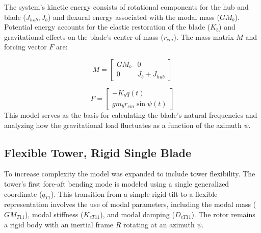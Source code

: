 \documentclass[onecolumn,draftcls]{IEEEtran}
\begin{document}
The system's kinetic energy consists of rotational components for the hub and blade ($J_{hub}, J_b$) and flexural energy associated with the modal mass ($GM_b$). Potential energy accounts for the elastic restoration of the blade ($K_b$) and gravitational effects on the blade's center of mass ($r_{cm}$). The mass matrix $M$ and forcing vector $F$ are:

\begin{equation}
    \label{eq:flex_blade_mass_matrix} M =
    \begin{bmatrix}
        GM_{b} & 0 \\
        0 & J_{b} + J_{hub}
    \end{bmatrix}
\end{equation}

\begin{equation} 
    \label{eq:flex_blade_forcing_terms} F =
    \begin{bmatrix}
        -K_{b} q(t) \\
        g m_{b} r_{cm} \sin\psi(t)
    \end{bmatrix} 
\end{equation}
This model serves as the basis for calculating the blade's natural frequencies and analyzing how the gravitational load fluctuates as a function of the azimuth $\psi$.

\subsection*{Flexible Tower, Rigid Single Blade}
To increase complexity the model was expanded to include tower flexibility. The tower's first fore-aft bending mode is modeled using a single generalized coordinate ($q_{T1}$). This transition from a simple rigid tilt to a flexible representation involves the use of modal parameters, including the modal mass ($GM_{T11}$), modal stiffness ($K_{eT11}$), and modal damping ($D_{eT11}$). The rotor remains a rigid body with an inertial frame $R$ rotating at an azimuth $\psi$.
\end{document}
